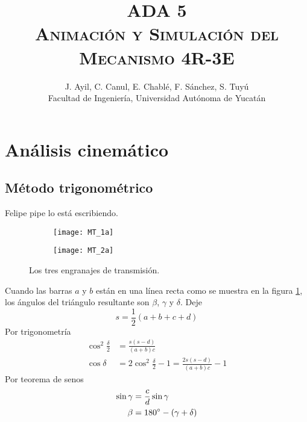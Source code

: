 \documentclass[12pt, final]{extarticle}
\title{ADA 5\\
\textsc{Animación y Simulación del Mecanismo 4R-3E}}
\author{J. Ayil, C. Canul, E. Chablé, F. Sánchez, S. Tuyú\\
{Facultad de Ingeniería, Universidad Autónoma de Yucatán}}
\date{}
\begin{document}
\maketitle

\begin{abstract}
    \blindtext
\end{abstract}

\section{Análisis cinemático}
\subsection{Método trigonométrico}
Felipe pipe lo está escribiendo.

\begin{figure}[ht]
    \centering
    \begin{subfigure}[b]{0.45\textwidth}
        \centering
        \texttt{[image: MT\_1a]}
        \caption{}
        \label{Fig: Los tres engranajes de transmision a}
    \end{subfigure}
    \hfill
    \begin{subfigure}[b]{0.45\textwidth}
        \centering
        \texttt{[image: MT\_2a]}
        \caption{}
        \label{Fig: Los tres engranajes de transmision b}
    \end{subfigure}
    \caption{Los tres engranajes de transmisión.}
    \label{Fig: Los tres engranajes de transmision}
\end{figure}

Cuando las barras $a$ y $b$ están en una línea recta como se muestra en la
figura \ref{Fig: Los tres engranajes de transmision a}, los ángulos del
triángulo resultante son $\beta$, $\gamma$ y $\delta$. Deje
\begin{equation}
    s = \frac{1}{2}(a + b + c + d)
\end{equation}
Por trigonometría
\begin{align}
    \cos^2 \frac{\delta}{2} &= \frac{s(s - d)}{(a + b)c} \\
    \cos \delta &= 2\cos^2 \frac{\delta}{2} - 1 = \frac{2s(s - d)}{(a + b)c} - 1
\end{align}
Por teorema de senos
\begin{align}
    \sin \gamma &= \frac{c}{d}\sin\gamma \\
    \beta &= 180\degree - (\gamma + \delta)
\end{align}
\end{document}

